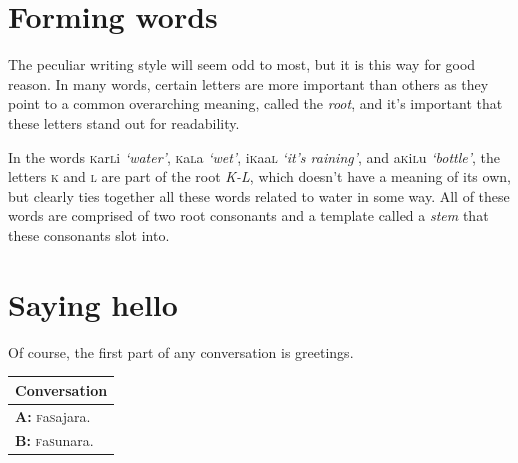 \documentclass[a5paper,10pt,twoside,openright]{memoir}
\newcommand{\famword}[5]{#1\textsc{#2}#3\textsc{#4}#5}
\newenvironment{conversation}
    {\begin{table}[ht]
        \begin{tabular}{p{0.962\textwidth}}
        \toprule
        \textbf{Conversation} \\
        \midrule
    }
    { 
        \bottomrule
        \end{tabular}
    \end{table}
    }
\newcommand{\diagline}[2]{\hspace{2em} \textbf{\uppercase{#1:}} {#2} \\}
\begin{document}
\chapter{Forming words}

The peculiar writing style will seem odd to most, but it is this way for good reason. In many words, certain letters are more important than others as they point to a common overarching meaning, called the \emph{root}, and it's important that these letters stand out for readability.

In the words \famword{}{k}{ar}{l}{i} \textit{`water'}, \famword{}{k}{a}{l}{a} \textit{`wet'}, \famword{i}{k}{aa}{l}{} \textit{`it's raining'}, and \famword{a}{k}{i}{l}{u} \textit{`bottle'}, the letters \textsc{k} and \textsc{l} are part of the root \emph{K-L}, which doesn't have a meaning of its own, but clearly ties together all these words related to water in some way. All of these words are comprised of two root consonants and a template called a \emph{stem} that these consonants slot into. 

\chapter{Saying hello}

Of course, the first part of any conversation is greetings.

\begin{conversation}
    \diagline{A}{\famword{}{f}{a}{s}{}ajara.}
    \diagline{B}{\famword{}{f}{a}{s}{}unara.}
\end{conversation}
\end{document}
